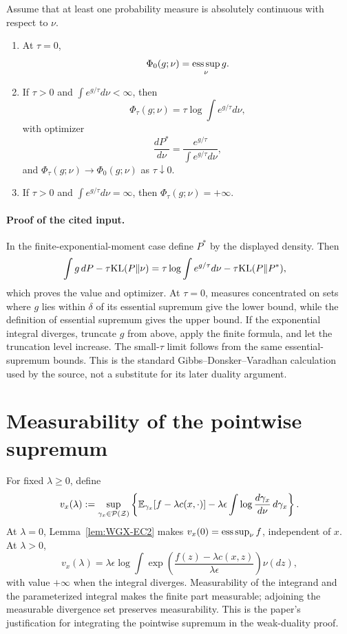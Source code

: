 \begin{lemma}[Lemma EC.2]\label{lem:WGX-EC2}
Assume that at least one probability measure is absolutely continuous with respect to $\nu$.
\begin{enumerate}[label=(\roman*),leftmargin=2em]
\item At $\tau=0$,
\[
 \Phi_0(g;\nu)=\operatorname*{ess\,sup}_\nu g.
\]
\item If $\tau>0$ and $\int e^{g/\tau}d\nu<\infty$, then
\[
 \Phi_\tau(g;\nu)
 =\tau\log\int e^{g/\tau}d\nu,
\]
with optimizer
\[
 \frac{dP^*}{d\nu}
 =\frac{e^{g/\tau}}{\int e^{g/\tau}d\nu},
\]
and $\Phi_\tau(g;\nu)\to\Phi_0(g;\nu)$ as $\tau\downarrow0$.
\item If $\tau>0$ and $\int e^{g/\tau}d\nu=\infty$, then $\Phi_\tau(g;\nu)=+\infty$.
\end{enumerate}
\end{lemma}

\paragraph{Proof of the cited input.}
In the finite-exponential-moment case define $P^*$ by the displayed density.  Then
\begin{align}
 \int g\,dP-\tau\mathrm{KL}(P\|\nu)
 &=\tau\log\int e^{g/\tau}d\nu
   -\tau\mathrm{KL}(P\|P^*),\label{eq:WGX-Gibbs-decomposition}
\end{align}
which proves the value and optimizer.  At $\tau=0$, measures concentrated on sets where $g$ lies within $\delta$ of its essential supremum give the lower bound, while the definition of essential supremum gives the upper bound.  If the exponential integral diverges, truncate $g$ from above, apply the finite formula, and let the truncation level increase.  The small-$\tau$ limit follows from the same essential-supremum bounds.  This is the standard Gibbs--Donsker--Varadhan calculation used by the source, not a substitute for its later duality argument.

\section{Measurability of the pointwise supremum}
For fixed $\lambda\ge0$, define
\begin{equation}\label{eq:WGX-vx}
 v_x(\lambda)
 :=\sup_{\gamma_x\in\mathcal{P}(\mathcal Z)}
 \left\{
 \mathbb{E}_{\gamma_x}[f-\lambda c(x,\cdot)]
 -\lambda\epsilon\int\log\frac{d\gamma_x}{d\nu}\,d\gamma_x
 \right\}.
\end{equation}
At $\lambda=0$, Lemma~\ref{lem:WGX-EC2} makes $v_x(0)=\operatorname*{ess\,sup}_\nu f$, independent of $x$.  At $\lambda>0$,
\begin{equation}\label{eq:WGX-vx-log}
 v_x(\lambda)
 =\lambda\epsilon\log
 \int\exp\!\left(\frac{f(z)-\lambda c(x,z)}{\lambda\epsilon}\right)\nu(dz),
\end{equation}
with value $+\infty$ when the integral diverges.  Measurability of the integrand and the parameterized integral makes the finite part measurable; adjoining the measurable divergence set preserves measurability.  This is the paper's justification for integrating the pointwise supremum in the weak-duality proof.

